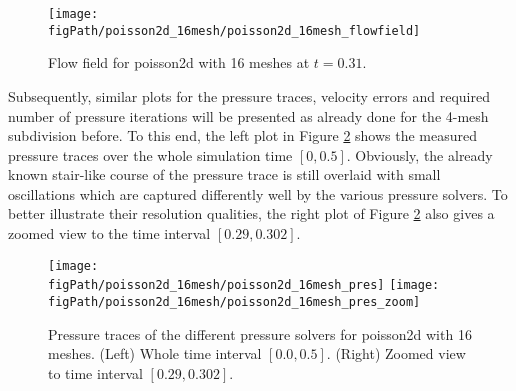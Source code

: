\begin{figure}[ht]
\begin{center}
\texttt{[image: \\figPath/poisson2d\_16mesh/poisson2d\_16mesh\_flowfield]}
\end{center}
\caption[Flow field for {\ct poisson2d} with 16 meshes]{Flow field for {\ct poisson2d} with 16 meshes at $t=0.31$.}
\label{FIG_scarc_poisson_sixteen_flowfield}
\end{figure}

Subsequently, similar plots for the pressure traces, velocity errors and required number of pressure iterations will be presented as already done for the 4-mesh subdivision before. 
To this end, the left plot in Figure \ref{FIG_SCARC_poisson_sixteen_trace} shows the measured pressure traces over the whole simulation time $[0,0.5]$. Obviously, the already known stair-like course of the pressure trace is still overlaid with small oscillations which are captured differently well by the various pressure solvers. To better illustrate their resolution qualities, the right plot of Figure \ref{FIG_SCARC_poisson_sixteen_trace} also gives a zoomed view to the time interval $[0.29, 0.302]$.

\begin{figure}[ht]
\begin{center}
\texttt{[image: \\figPath/poisson2d\_16mesh/poisson2d\_16mesh\_pres]}
\texttt{[image: \\figPath/poisson2d\_16mesh/poisson2d\_16mesh\_pres\_zoom]}
\end{center}
\caption[Pressure traces of the different pressure solvers for {\ct poisson2d} with 16 meshes]{Pressure traces of the different pressure solvers for {\ct poisson2d} with 16 meshes. (Left) Whole time interval $[0.0, 0.5]$. (Right) Zoomed view to time interval $[0.29, 0.302]$.}
\label{FIG_SCARC_poisson_sixteen_trace}
\end{figure}

